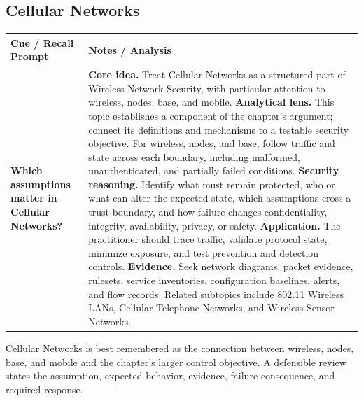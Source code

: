 \documentclass[11pt]{article}
\newcommand{\CornellHeader}{%
\rowcolor{Navy}\color{white}\bfseries Cue / Recall Prompt & \color{white}\bfseries Notes / Analysis\\\hline}
\newcommand{\CornellRow}[2]{%
\cellcolor{CueGray}\RaggedRight\textbf{#1} & \RaggedRight #2\\\hline}
\begin{document}
\subsection*{Cellular Networks}
\begin{longtable}{>{\RaggedRight\arraybackslash}p{}|>{\RaggedRight\arraybackslash}p{}}
\CornellHeader
\CornellRow{Which assumptions matter in Cellular Networks?}{\textbf{Core idea.} Treat Cellular Networks as a structured part of Wireless Network Security, with particular attention to wireless, nodes, base, and mobile. \textbf{Analytical lens.} This topic establishes a component of the chapter's argument; connect its definitions and mechanisms to a testable security objective. For wireless, nodes, and base, follow traffic and state across each boundary, including malformed, unauthenticated, and partially failed conditions. \textbf{Security reasoning.} Identify what must remain protected, who or what can alter the expected state, which assumptions cross a trust boundary, and how failure changes confidentiality, integrity, availability, privacy, or safety. \textbf{Application.} The practitioner should trace traffic, validate protocol state, minimize exposure, and test prevention and detection controls. \textbf{Evidence.} Seek network diagrams, packet evidence, rulesets, service inventories, configuration baselines, alerts, and flow records. Related subtopics include 802.11 Wireless LANs, Cellular Telephone Networks, and Wireless Sensor Networks.}
\end{longtable}
\begin{topicsummary}
Cellular Networks is best remembered as the connection between wireless, nodes, base, and mobile and the chapter's larger control objective. A defensible review states the assumption, expected behavior, evidence, failure consequence, and required response.
\end{topicsummary}
\end{document}
